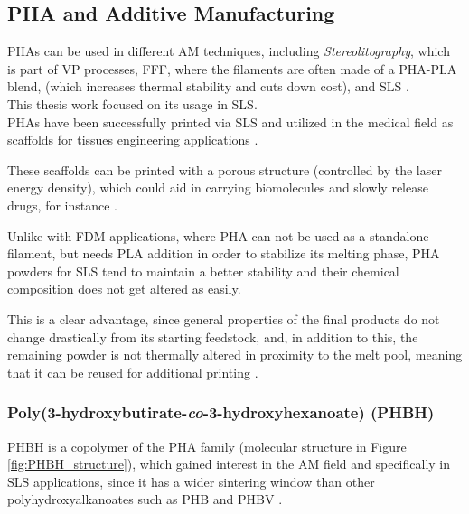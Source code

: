 \documentclass{article}
\begin{document}
    \clearpage

    
    \subsection{PHA and Additive Manufacturing \label{PHA_in_Additive}}

    PHAs can be used in different AM techniques, including \textit{Stereolitography}, which is part of VP processes, 
    FFF, where the filaments are often made of a PHA-PLA blend, (which increases thermal stability and cuts down cost), 
    and SLS \autocite{Kovalcik_PHA_Review}. \\ 

    This thesis work focused on its usage in SLS. \\ 

    PHAs have been successfully printed via SLS and utilized in the medical field as scaffolds for tissues engineering applications \autocites{Messori_Bondioli_PHAs}. 

    These scaffolds can be printed with a porous structure (controlled by the laser energy density), 
    which could aid in carrying biomolecules and slowly release drugs, for instance \autocites{Messori_Bondioli_PHAs}.
    
    Unlike with FDM applications, where PHA can not be used as a standalone filament, but needs PLA addition in order to stabilize its melting 
    phase, PHA powders for SLS tend to maintain a better stability and their chemical composition does not get altered as easily. 

    This is a clear advantage, since general properties of the final products do not change drastically from its starting feedstock, 
    and, in addition to this, the remaining powder is not thermally altered in proximity to the melt pool, meaning that it can 
    be reused for additional printing \autocite{Kovalcik_PHA_Review}.  \\
        
    \subsubsection{Poly(3-hydroxybutirate-\textit{co}-3-hydroxyhexanoate) (PHBH) \label{PHBH}}

    PHBH is a copolymer of the PHA family (molecular structure in Figure \ref{fig:PHBH_structure}), which gained 
    interest in the AM field and specifically in SLS applications, since it has a wider sintering window than other polyhydroxyalkanoates
    such as PHB and PHBV \autocites{DechetMaximilianA2020OtDo,doi:10.1063/1.4918516}. \\ 
\end{document}
